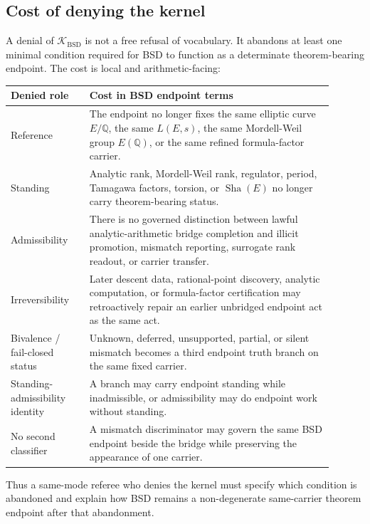 \documentclass[11pt]{article}
\newcommand{\Q}{\mathbb{Q}}
\newcommand{\Sha}{\operatorname{Sha}}
\newcommand{\BSD}{\mathrm{BSD}}
\newcommand{\Kern}{\mathcal{K}}
\begin{document}
\subsection*{Cost of denying the kernel}
A denial of $\Kern_{\BSD}$ is not a free refusal of vocabulary. It abandons at least one minimal condition required for BSD to function as a determinate theorem-bearing endpoint. The cost is local and arithmetic-facing:
\begin{longtable}{L{0.22\linewidth}L{0.68\linewidth}}
\toprule
\textbf{Denied role} & \textbf{Cost in BSD endpoint terms}\\
\midrule
Reference & The endpoint no longer fixes the same elliptic curve $E/\Q$, the same $L(E,s)$, the same Mordell-Weil group $E(\Q)$, or the same refined formula-factor carrier.\\
Standing & Analytic rank, Mordell-Weil rank, regulator, period, Tamagawa factors, torsion, or $\Sha(E)$ no longer carry theorem-bearing status.\\
Admissibility & There is no governed distinction between lawful analytic-arithmetic bridge completion and illicit promotion, mismatch reporting, surrogate rank readout, or carrier transfer.\\
Irreversibility & Later descent data, rational-point discovery, analytic computation, or formula-factor certification may retroactively repair an earlier unbridged endpoint act as the same act.\\
Bivalence / fail-closed status & Unknown, deferred, unsupported, partial, or silent mismatch becomes a third endpoint truth branch on the same fixed carrier.\\
Standing-admissibility identity & A branch may carry endpoint standing while inadmissible, or admissibility may do endpoint work without standing.\\
No second classifier & A mismatch discriminator may govern the same BSD endpoint beside the bridge while preserving the appearance of one carrier.\\
\bottomrule
\end{longtable}
Thus a same-mode referee who denies the kernel must specify which condition is abandoned and explain how BSD remains a non-degenerate same-carrier theorem endpoint after that abandonment.
\end{document}
